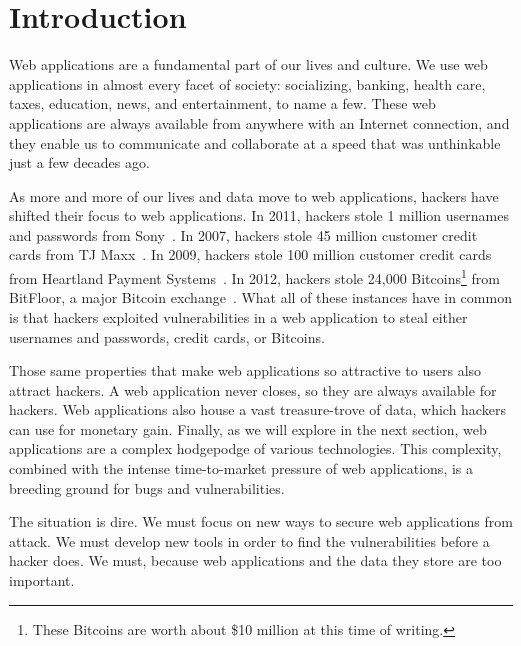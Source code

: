 \def\currentprefix{intro}



%
%

\chapter{Introduction}

Web applications are a fundamental part of our lives and culture. We
use web applications in almost every facet of society: socializing,
banking, health care, taxes, education, news, and entertainment, to
name a few. These web applications are always available from anywhere
with an Internet connection, and they enable us to communicate and
collaborate at a speed that was unthinkable just a few decades ago.

As more and more of our lives and data move to web applications,
hackers have shifted their focus to web applications. In 2011, hackers
stole 1 million usernames and passwords from
Sony~\cite{bilton11:sony}. In 2007, hackers stole 45 million customer
credit cards from TJ Maxx~\cite{jewell07:tjmaxx}. In 2009, hackers
stole 100 million customer credit cards from Heartland Payment
Systems~\cite{acohido09:heartland}. In 2012, hackers stole 24,000
Bitcoins\footnote{These Bitcoins are worth about \$10 million at this
  time of writing.} from BitFloor, a major Bitcoin
exchange~\cite{kirk12:bitfloor}. What all of these instances have in
common is that hackers exploited vulnerabilities in a web application
to steal either usernames and passwords, credit cards, or Bitcoins.

Those same properties that make web applications so attractive to
users also attract hackers. A web application never closes, so they
are always available for hackers. Web applications also house a vast
treasure-trove of data, which hackers can use for monetary gain.
Finally, as we will explore in the next section, web applications are
a complex hodgepodge of various technologies. This complexity,
combined with the intense time-to-market pressure of web applications,
is a breeding ground for bugs and vulnerabilities.

The situation is dire. We must focus on new ways to secure web
applications from attack. We must develop new tools in order to find
the vulnerabilities before a hacker does. We must, because web
applications and the data they store are too important.

